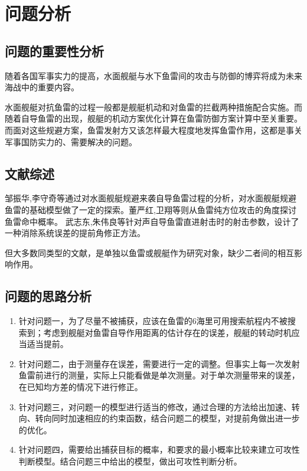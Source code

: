 \documentclass[12pt]{article}%
\begin{document}
\section{问题分析}
\subsection{问题的重要性分析}
随着各国军事实力的提高，水面舰艇与水下鱼雷间的攻击与防御的博弈将成为未来海战中的重要内容。

水面舰艇对抗鱼雷的过程一般都是舰艇机动和对鱼雷的拦截两种措施配合实施。而随着自导鱼雷的出现，舰艇的机动方案优化计算在鱼雷防御方案计算中至关重要。而面对这些规避方案，鱼雷发射方又该怎样最大程度地发挥鱼雷作用，这都是事关军事国防实力的、需要解决的问题。

\subsection{文献综述}
邹振华,李守奇等通过对水面舰艇规避来袭自导鱼雷过程的分析，对水面舰艇规避鱼雷的基础模型做了一定的探索\cite{1}。董严红,卫翔等则从鱼雷纯方位攻击的角度探讨鱼雷命中概率\cite{3}。 武志东,朱伟良等针对声自导鱼雷直进射击时的射击参数，设计了一种消除系统误差的提前角修正方法\cite{2}。

但大多数同类型的文献，是单独以鱼雷或舰艇作为研究对象，缺少二者间的相互影响作用。
\subsection{问题的思路分析}
\begin{enumerate}[1.]\addtolength{\itemsep}{-1.5ex}
\item 针对问题一，为了尽量不被捕获，应该在鱼雷的6海里可用搜索航程内不被搜索到；考虑到舰艇对鱼雷自导作用距离的估计存在的误差，舰艇的转动时机应当适当提前。
\item 针对问题二，由于测量存在误差，需要进行一定的调整。但事实上每一次发射鱼雷前进行的测量，实际上只能看做是单次测量。对于单次测量带来的误差，在已知均方差的情况下进行修正。
\item 针对问题三，对问题一的模型进行适当的修改，通过合理的方法给出加速、转向、转向同时加速相应的约束函数，结合问题二的模型，对提前角做出进一步的优化。
\item 针对问题四，需要给出捕获目标的概率，和要求的最小概率比较来建立可攻性判断模型。结合问题三中给出的模型，做出可攻性判断分析。
\end{enumerate}
\end{document}
